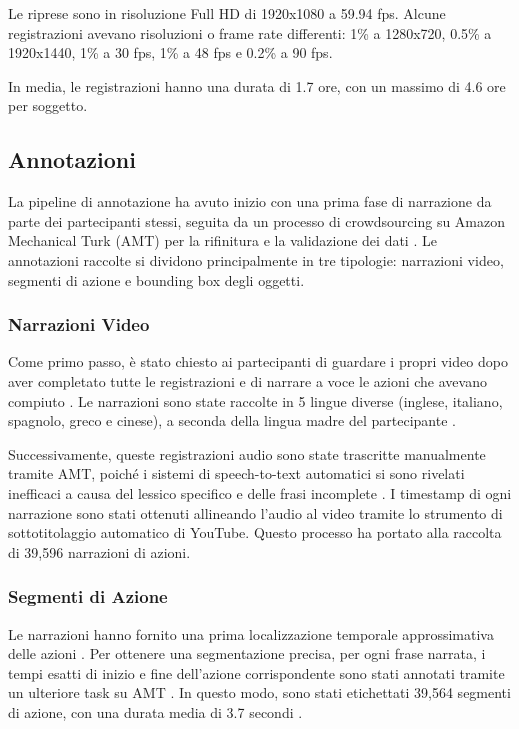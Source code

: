 Le riprese sono in risoluzione Full HD di 1920x1080 a 59.94 fps. Alcune registrazioni avevano risoluzioni o frame rate differenti: 1\% a 1280x720, 0.5\% a 1920x1440, 1\% a 30 fps, 1\% a 48 fps e 0.2\% a 90 fps.

In media, le registrazioni hanno una durata di 1.7 ore, con un massimo di 4.6 ore per soggetto.

\subsection*{Annotazioni}
La pipeline di annotazione ha avuto inizio con una prima fase di narrazione da parte dei partecipanti stessi, seguita da un processo di crowdsourcing su Amazon Mechanical Turk (AMT) \cite{mturk} per la rifinitura e la validazione dei dati \cite{Damen2021PAMI}. Le annotazioni raccolte si dividono principalmente in tre tipologie: narrazioni video, segmenti di azione e bounding box degli oggetti.

\subsubsection* {Narrazioni Video}
Come primo passo, è stato chiesto ai partecipanti di guardare i propri video dopo aver completato tutte le registrazioni e di narrare a voce le azioni che avevano compiuto \cite{Damen2021PAMI}. Le narrazioni sono state raccolte in 5 lingue diverse (inglese, italiano, spagnolo, greco e cinese), a seconda della lingua madre del partecipante \cite{Damen2021PAMI}.

Successivamente, queste registrazioni audio sono state trascritte manualmente tramite AMT, poiché i sistemi di speech-to-text automatici \cite{google_speech,ibm_watson,cmu_sphinx} si sono rivelati inefficaci a causa del lessico specifico e delle frasi incomplete \cite{Damen2021PAMI}. I timestamp di ogni narrazione sono stati ottenuti allineando l'audio al video tramite lo strumento di sottotitolaggio automatico di YouTube. Questo processo ha portato alla raccolta di 39,596 narrazioni di azioni.

\subsubsection* {Segmenti di Azione}
Le narrazioni hanno fornito una prima localizzazione temporale approssimativa delle azioni \cite{Damen2021PAMI}. Per ottenere una segmentazione precisa, per ogni frase narrata, i tempi esatti di inizio e fine dell'azione corrispondente sono stati annotati tramite un ulteriore task su AMT \cite{Damen2021PAMI}. In questo modo, sono stati etichettati 39,564 segmenti di azione, con una durata media di 3.7 secondi \cite{Damen2021PAMI}.

